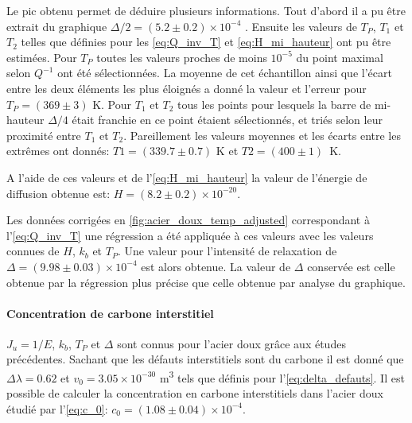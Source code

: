 Le pic obtenu permet de déduire plusieurs informations. Tout d'abord il a pu être extrait du graphique $\Delta / 2 = (5.2 \pm 0.2) \times 10^{-4}$ . Ensuite les valeurs de $T_P$, $T_1$ et $T_2$ telles que définies pour les \autoref{eq:Q_inv_T} et \autoref{eq:H_mi_hauteur} ont pu être estimées. Pour $T_P$ toutes les valeurs proches de moins $10^{-5}$ du point maximal selon $Q^{-1}$ ont été sélectionnées. La moyenne de cet échantillon ainsi que l'écart entre les deux éléments les plus éloignés a donné la valeur et l'erreur pour $T_P = (369 \pm 3)$ \si{\kelvin}. Pour $T_1$ et $T_2$ tous les points pour lesquels la barre de mi-hauteur $\Delta / 4$ était franchie en ce point étaient sélectionnés, et triés selon leur proximité entre $T_1$ et $T_2$. Pareillement les valeurs moyennes et les écarts entre les extrêmes ont donnés: $T1 = (339.7 \pm 0.7)$ \si{\kelvin} et \mbox{$T2 = (400 \pm 1)$ \si{\kelvin}}.

A l'aide de ces valeurs et de l'\autoref{eq:H_mi_hauteur} la valeur de l'énergie de diffusion obtenue est: $H = (8.2 \pm 0.2)\times 10^{-20}$.

Les données corrigées en \autoref{fig:acier_doux_temp_adjusted} correspondant à l'\autoref{eq:Q_inv_T} une régression a été appliquée à ces valeurs avec les valeurs connues de $H$, $k_b$ et $T_P$. Une valeur pour l'intensité de relaxation de \(\Delta = (9.98 \pm 0.03) \times 10^{-4}\) est alors obtenue. La valeur de $\Delta$ conservée est celle obtenue par la régression plus précise que celle obtenue par analyse du graphique. 


\paragraph{Concentration de carbone interstitiel}

$J_u = 1/E$, $k_b$, $T_P$ et $\Delta$ sont connus pour l'acier doux grâce aux études précédentes. Sachant que les défauts interstitiels sont du carbone il est donné que $\Delta\lambda = 0.62$ et $v_0 = 3.05 \times 10^{-30}$ \si{\cubic\meter} tels que définis pour l'\autoref{eq:delta_defauts}. Il est possible de calculer la concentration en carbone interstitiels dans l'acier doux étudié par l'\autoref{eq:c_0}: $c_0 = (1.08 \pm 0.04)\times 10^{-4}$.